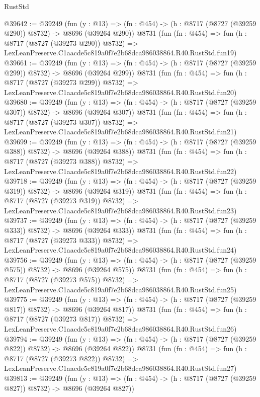 \begin{lexlean}{RustStd}
\begin{coremodule}
@39642 := @39249
    (fun (y : @13) => (fn : @454) -> (h : @8717 (@8727 (@39259 @290)) @8732) -> @8696 (@39264 @290))
    @8731
    (fun (fn : @454) =>
    fun (h : @8717 (@8727 (@39273 @290)) @8732) =>
    LexLeanPreserve.C1aacde5c819a0f7e2b68dca986038864.R40.RustStd.fun19)
@39661 := @39249
    (fun (y : @13) => (fn : @454) -> (h : @8717 (@8727 (@39259 @299)) @8732) -> @8696 (@39264 @299))
    @8731
    (fun (fn : @454) =>
    fun (h : @8717 (@8727 (@39273 @299)) @8732) =>
    LexLeanPreserve.C1aacde5c819a0f7e2b68dca986038864.R40.RustStd.fun20)
@39680 := @39249
    (fun (y : @13) => (fn : @454) -> (h : @8717 (@8727 (@39259 @307)) @8732) -> @8696 (@39264 @307))
    @8731
    (fun (fn : @454) =>
    fun (h : @8717 (@8727 (@39273 @307)) @8732) =>
    LexLeanPreserve.C1aacde5c819a0f7e2b68dca986038864.R40.RustStd.fun21)
@39699 := @39249
    (fun (y : @13) => (fn : @454) -> (h : @8717 (@8727 (@39259 @388)) @8732) -> @8696 (@39264 @388))
    @8731
    (fun (fn : @454) =>
    fun (h : @8717 (@8727 (@39273 @388)) @8732) =>
    LexLeanPreserve.C1aacde5c819a0f7e2b68dca986038864.R40.RustStd.fun22)
@39718 := @39249
    (fun (y : @13) => (fn : @454) -> (h : @8717 (@8727 (@39259 @319)) @8732) -> @8696 (@39264 @319))
    @8731
    (fun (fn : @454) =>
    fun (h : @8717 (@8727 (@39273 @319)) @8732) =>
    LexLeanPreserve.C1aacde5c819a0f7e2b68dca986038864.R40.RustStd.fun23)
@39737 := @39249
    (fun (y : @13) => (fn : @454) -> (h : @8717 (@8727 (@39259 @333)) @8732) -> @8696 (@39264 @333))
    @8731
    (fun (fn : @454) =>
    fun (h : @8717 (@8727 (@39273 @333)) @8732) =>
    LexLeanPreserve.C1aacde5c819a0f7e2b68dca986038864.R40.RustStd.fun24)
@39756 := @39249
    (fun (y : @13) => (fn : @454) -> (h : @8717 (@8727 (@39259 @575)) @8732) -> @8696 (@39264 @575))
    @8731
    (fun (fn : @454) =>
    fun (h : @8717 (@8727 (@39273 @575)) @8732) =>
    LexLeanPreserve.C1aacde5c819a0f7e2b68dca986038864.R40.RustStd.fun25)
@39775 := @39249
    (fun (y : @13) => (fn : @454) -> (h : @8717 (@8727 (@39259 @817)) @8732) -> @8696 (@39264 @817))
    @8731
    (fun (fn : @454) =>
    fun (h : @8717 (@8727 (@39273 @817)) @8732) =>
    LexLeanPreserve.C1aacde5c819a0f7e2b68dca986038864.R40.RustStd.fun26)
@39794 := @39249
    (fun (y : @13) => (fn : @454) -> (h : @8717 (@8727 (@39259 @822)) @8732) -> @8696 (@39264 @822))
    @8731
    (fun (fn : @454) =>
    fun (h : @8717 (@8727 (@39273 @822)) @8732) =>
    LexLeanPreserve.C1aacde5c819a0f7e2b68dca986038864.R40.RustStd.fun27)
@39813 := @39249
    (fun (y : @13) => (fn : @454) -> (h : @8717 (@8727 (@39259 @827)) @8732) -> @8696 (@39264 @827))

\end{coremodule}
\end{lexlean}
